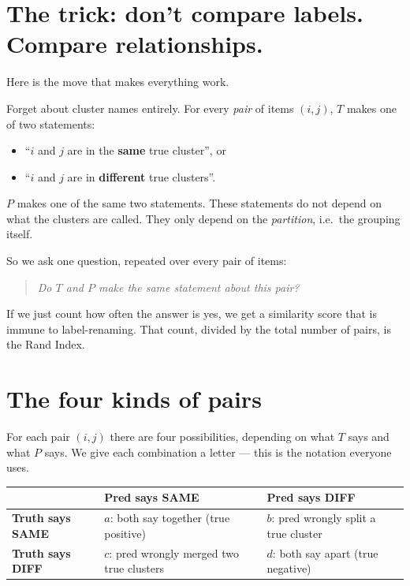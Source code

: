 \documentclass[11pt]{article}
\begin{document}
\section{The trick: don't compare labels. Compare relationships.}

Here is the move that makes everything work.

Forget about cluster names entirely. For every \emph{pair} of items
$(i, j)$, $T$ makes one of two statements:
\begin{itemize}\setlength\itemsep{0pt}
  \item ``$i$ and $j$ are in the \textbf{same} true cluster'', or
  \item ``$i$ and $j$ are in \textbf{different} true clusters''.
\end{itemize}
$P$ makes one of the same two statements. These statements do not depend
on what the clusters are called. They only depend on the \emph{partition},
i.e.\ the grouping itself.

So we ask one question, repeated over every pair of items:
\begin{quote}\itshape
  Do $T$ and $P$ make the same statement about this pair?
\end{quote}

If we just count how often the answer is yes, we get a similarity score
that is immune to label-renaming. That count, divided by the total number
of pairs, is the Rand Index.

\section{The four kinds of pairs}

For each pair $(i, j)$ there are four possibilities, depending on what $T$
says and what $P$ says. We give each combination a letter --- this is the
notation everyone uses.

\begin{table}[H]
\centering
\renewcommand{\arraystretch}{1.5}
\begin{tabular}{|l|l|l|}
\hline
 & \textbf{Pred says SAME} & \textbf{Pred says DIFF} \\ \hline
\textbf{Truth says SAME}
  & \cellcolor{cellhi}$a$: both say together (true positive)
  & \cellcolor{cellwarn}$b$: pred wrongly split a true cluster \\ \hline
\textbf{Truth says DIFF}
  & \cellcolor{cellwarn}$c$: pred wrongly merged two true clusters
  & \cellcolor{cellhi}$d$: both say apart (true negative) \\ \hline
\end{tabular}
\end{table}
\end{document}
